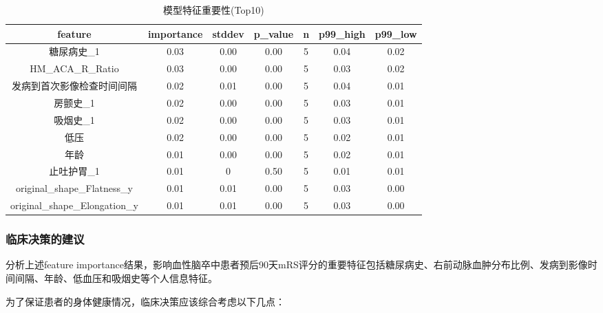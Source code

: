 \documentclass[bwprint]{gmcmthesis}
\begin{document}
\begin{table}[ht]
    \centering
    \caption{模型特征重要性(Top10)}
    \label{tab:第二问模型特征重要性(Top10)}
    \fontsize{11}{9}\selectfont
    \renewcommand\tabcolsep{6pt}
    {
    \begin{tabular}{ccccccc}
    \toprule[1.2pt]
   feature                                           & importance & stddev & p\_value & n & p99\_high & p99\_low \\
   \midrule
糖尿病史\_1                        & 0.03       & 0.00   & 0.00     & 5 & 0.04      & 0.02     \\
HM\_ACA\_R\_Ratio              & 0.03       & 0.00   & 0.00     & 5 & 0.03      & 0.02     \\
发病到首次影像检查时间间隔                  & 0.02       & 0.01   & 0.00     & 5 & 0.04      & 0.01     \\
房颤史\_1                         & 0.02       & 0.00   & 0.00     & 5 & 0.03      & 0.01     \\
吸烟史\_1                         & 0.02       & 0.00   & 0.00     & 5 & 0.03      & 0.01     \\
低压                             & 0.02       & 0.00   & 0.00     & 5 & 0.02      & 0.01     \\
年龄                             & 0.01       & 0.00   & 0.00     & 5 & 0.02      & 0.01     \\
止吐护胃\_1                        & 0.01       & 0      & 0.50     & 5 & 0.01      & 0.01     \\
original\_shape\_Flatness\_y   & 0.01       & 0.01   & 0.00     & 5 & 0.03      & 0.00     \\
original\_shape\_Elongation\_y & 0.01       & 0.01   & 0.00     & 5 & 0.03      & 0.00      \\
    \bottomrule[1.2pt]
    \end{tabular}
    }
\end{table}

\subsubsection{临床决策的建议}
分析上述feature importance结果，影响血性脑卒中患者预后90天mRS评分的重要特征包括糖尿病史、右前动脉血肿分布比例、发病到影像时间间隔、年龄、低血压和吸烟史等个人信息特征。

为了保证患者的身体健康情况，临床决策应该综合考虑以下几点：
\end{document}
